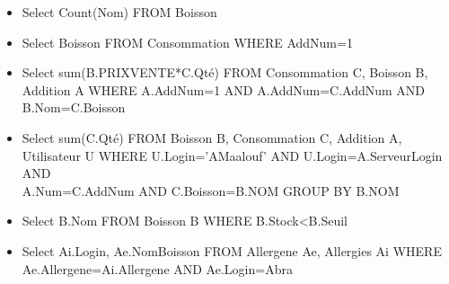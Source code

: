 \documentclass[11pt, a4, oneside, headings=normal]{scrreprt}
\begin{document}
\begin{itemize}
\item Select Count(Nom) FROM Boisson
\item Select Boisson FROM Consommation WHERE AddNum=1
\item Select sum(B.PRIXVENTE*C.Qté) FROM Consommation C, Boisson B, Addition A WHERE A.AddNum=1 AND A.AddNum=C.AddNum AND B.Nom=C.Boisson
\item Select sum(C.Qté) FROM Boisson B, Consommation C, Addition A, Utilisateur U WHERE U.Login='AMaalouf' AND U.Login=A.ServeurLogin AND \\ A.Num=C.AddNum AND C.Boisson=B.NOM GROUP BY B.NOM
\item Select B.Nom FROM Boisson B WHERE B.Stock<B.Seuil

\item Select Ai.Login, Ae.NomBoisson FROM Allergene Ae, Allergies Ai WHERE \\ Ae.Allergene=Ai.Allergene AND Ae.Login=Abra
\end{itemize}
\end{document}
